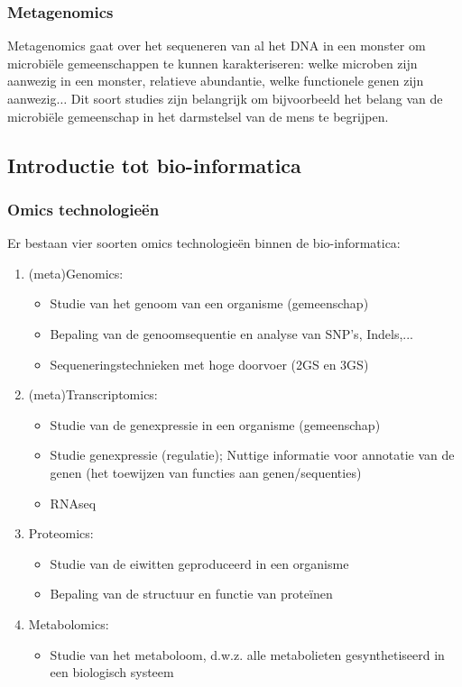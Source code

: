 \documentclass[a4paper,kul]{kulakarticle} %
\begin{document}
\subsubsection{Metagenomics}
Metagenomics gaat over het sequeneren van al het DNA in een monster om microbiële gemeenschappen te kunnen karakteriseren: welke microben zijn aanwezig in een monster, relatieve abundantie, welke functionele genen zijn aanwezig$\ldots$ Dit soort studies zijn belangrijk om bijvoorbeeld het belang van de microbiële gemeenschap in het darmstelsel van de mens te begrijpen. 
\newpage
\subsection{Introductie tot bio-informatica}
\subsubsection{Omics technologieën}
Er bestaan vier soorten omics technologieën binnen de bio-informatica:
\begin{enumerate}
	\item (meta)Genomics:
		\begin{itemize}
			\item Studie van het genoom van een organisme
			(gemeenschap)
			\item Bepaling van de genoomsequentie en analyse van SNP's, Indels,...
			\item Sequeneringstechnieken met hoge doorvoer (2GS en 3GS)
		\end{itemize}
	\item (meta)Transcriptomics:
		\begin{itemize}
			\item Studie van de genexpressie in een
			organisme (gemeenschap)
			\item Studie genexpressie (regulatie); Nuttige informatie voor annotatie van
			de genen (het toewijzen van functies aan genen/sequenties)
			\item RNAseq
		\end{itemize}
	\item Proteomics:
		\begin{itemize}
			\item Studie van de eiwitten geproduceerd in een organisme
			\item Bepaling van de structuur en functie van proteïnen
		\end{itemize}
	\item Metabolomics:
		\begin{itemize}
			\item Studie van het metaboloom, d.w.z. alle metabolieten gesynthetiseerd
			in een biologisch systeem
		\end{itemize}
\end{enumerate}
\end{document}
